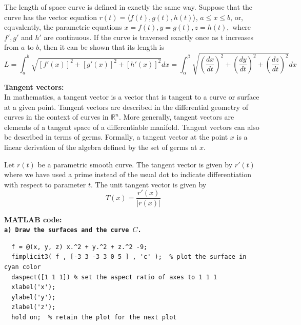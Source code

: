 The length of space curve is defined in exactly the same way. Suppose that the curve has the vector equation $r(t)=\langle f(t), g(t), h(t) \rangle$, $a\leq x\leq b$, or, equvalently, the parametric equations $x=f(t), y=g(t), z=h(t),$ where $f',g'$ and $h'$ are continuous. If the curve is traversed exactly once as t increases from $a$ to $b$, then it can be shown that its length is
$$ L = \int_{a}^{b} \sqrt{\left[f'(x)\right]^2 + \left[g'(x)\right]^2 + \left[h'(x)\right]^2} dx = \int_{\alpha}^{\beta} \sqrt{\left(\dfrac{dx}{dt}\right)^2 + \left(\dfrac{dy}{dt}\right)^2 + \left(\dfrac{dz}{dt}\right)^2} dx  $$

\vspace*{0.5cm}

\textbf{Tangent vectors: }\\
In mathematics, a tangent vector is a vector that is tangent to a curve or surface at a given point. Tangent vectors are described in the differential geometry of curves in the context of curves in $\mathbb{R}^n$. More generally, tangent vectors are elements of a tangent space of a differentiable manifold. Tangent vectors can also be described in terms of germs. Formally, a tangent vector at the point $x$ is a linear derivation of the algebra defined by the set of germs at $x$.

Let $r(t)$ be a parametric smooth curve. The tangent vector is given by $r'(t)$ where we have used a prime instead of the usual dot to indicate differentiation with respect to parameter $t$. The unit tangent vector is given by
$$ T(x) = \dfrac{r'(x)}{\lvert r(x) \rvert} $$

\vspace*{1cm}

\textbf{MATLAB code: }\\
\textbf{\texttt{a) Draw the surfaces and the curve $C$.} }

\begin{lstlisting}[style=Matlab-editor]
  % Plot the the surface x^2 + y^2 + z^2 = 9
  f = @(x, y, z) x.^2 + y.^2 + z.^2 -9;
  fimplicit3( f , [-3 3 -3 3 0 5 ] , 'c' );  % plot the surface in cyan color
  daspect([1 1 1]) % set the aspect ratio of axes to 1 1 1
  xlabel('x');
  ylabel('y');
  zlabel('z');
  hold on;  % retain the plot for the next plot  
\end{lstlisting}

